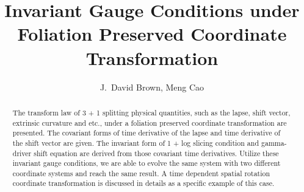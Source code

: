 \documentclass[letterpaper,nofootinbib,prd,amsmath,onecolumn]{revtex4-1}
\begin{document}

\title{Invariant Gauge Conditions under Foliation Preserved Coordinate Transformation}
\author{J.~David Brown, Meng Cao}

\begin{abstract}
The transform law of 3 + 1 splitting physical quantities, such as the lapse, shift vector, extrinsic curvature and etc., under a foliation preserved coordinate transformation are presented. The covariant forms of time derivative of the lapse and time derivative of the shift vector are given. The invariant form of 1 + log slicing condition and gamma-driver shift equation are derived from those covariant time derivatives. Utilize these invariant gauge conditions, we are able to evolve the same system with two different coordinate systems and reach the same result. A time dependent spatial rotation coordinate transformation is discussed in details as a specific example of this case.  
\end{abstract}
\maketitle
\end{document}
